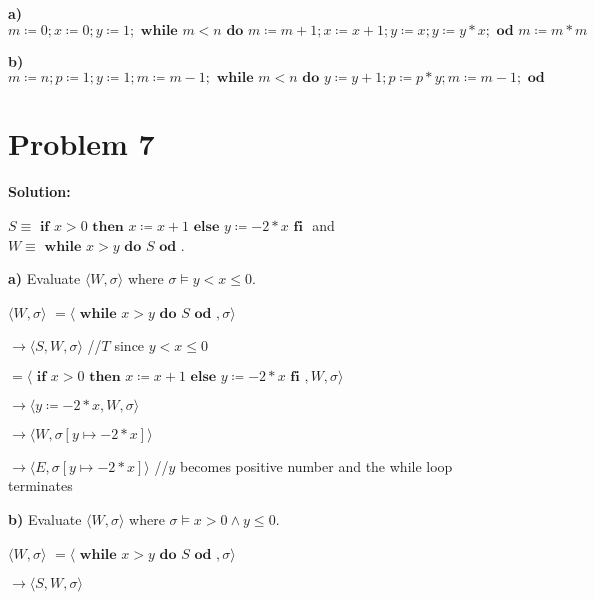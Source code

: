 \documentclass{article}
\begin{document}
\textbf{a)} $ m \coloneqq 0; x \coloneqq 0; y \coloneqq 1; \textbf{ while } m<n \textbf{ do } m \coloneqq m+1; x \coloneqq x+1; y \coloneqq x; y \coloneqq y*x; \textbf{ od } m \coloneqq m*m $

\vspace{10pt}

\textbf{b)} $ m \coloneqq n; p \coloneqq 1; y \coloneqq 1; m \coloneqq m-1; \textbf{ while } m<n \textbf{ do } y \coloneqq y+1; p \coloneqq p*y; m \coloneqq m-1; \textbf{ od }$


\section*{Problem 7}
\textbf{Solution:}

$ S \equiv \textbf{ if } x>0 \textbf{ then } x \coloneqq x+1 \textbf{ else } y \coloneqq -2*x \textbf{ fi }$ and $ W \equiv \textbf{ while } x>y \textbf{ do } S \textbf{ od } $.

\textbf{a)} Evaluate $ \langle W, \sigma \rangle $ where $ \sigma \vDash y<x \leq 0 $.

\qquad $\langle W, \sigma \rangle $ \qquad \quad $= \langle \textbf{ while } x>y \textbf{ do } S \textbf{ od }, \sigma \rangle $

\qquad \qquad \qquad \qquad $\rightarrow \langle S, W, \sigma \rangle $ \qquad \qquad \qquad //$T$ since $y<x \leq 0$

\qquad \qquad \qquad \qquad $= \langle \textbf{ if } x>0 \textbf{ then } x \coloneqq x+1 \textbf{ else } y \coloneqq -2*x \textbf{ fi }, W, \sigma \rangle $

\qquad \qquad \qquad \qquad $\rightarrow \langle y \coloneqq -2*x, W, \sigma \rangle $

\qquad \qquad \qquad \qquad $\rightarrow \langle W, \sigma[y \mapsto -2*x] \rangle $

\qquad \qquad \qquad \qquad $\rightarrow \langle E, \sigma[y \mapsto -2*x] \rangle $ \qquad //$y$ becomes positive number and the while loop terminates

\vspace{10pt}

\textbf{b)} Evaluate $ \langle W, \sigma \rangle $ where $ \sigma \vDash x>0 \wedge y \leq 0 $.

\qquad $\langle W, \sigma \rangle $ \qquad \quad $= \langle \textbf{ while } x>y \textbf{ do } S \textbf{ od }, \sigma \rangle $

\qquad \qquad \qquad \qquad $\rightarrow \langle S, W, \sigma \rangle $ \qquad \qquad \qquad
\end{document}
